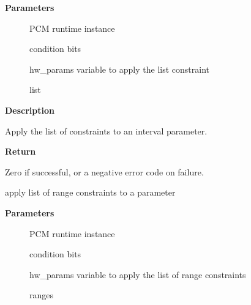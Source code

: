 \documentclass[a4paper,8pt,english]{sphinxmanual}
\begin{document}
\textbf{Parameters}
\begin{description}
\item[{}] \leavevmode
PCM runtime instance

\item[{}] \leavevmode
condition bits

\item[{}] \leavevmode
hw\_params variable to apply the list constraint

\item[{}] \leavevmode
list

\end{description}

\textbf{Description}

Apply the list of constraints to an interval parameter.

\textbf{Return}

Zero if successful, or a negative error code on failure.

\begin{fulllineitems}
\label{sound/kernel-api/alsa-driver-api:c.snd_pcm_hw_constraint_ranges}
apply list of range constraints to a parameter

\end{fulllineitems}


\textbf{Parameters}
\begin{description}
\item[{}] \leavevmode
PCM runtime instance

\item[{}] \leavevmode
condition bits

\item[{}] \leavevmode
hw\_params variable to apply the list of range constraints

\item[{}] \leavevmode
ranges

\end{description}
\end{document}
